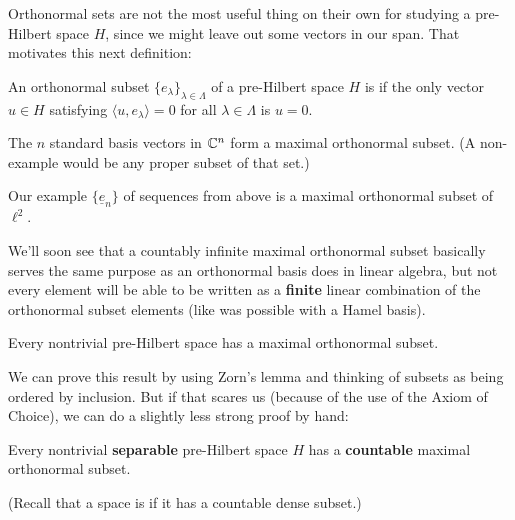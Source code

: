 Orthonormal sets are not the most useful thing on their own for studying a pre-Hilbert space $H$, since we might leave out some vectors in our span. That motivates this next definition:

\begin{definition}
An orthonormal subset $\{e_{\lambda}\}_{\lambda \in \Lambda}$ of a pre-Hilbert space $H$ is  if the only vector $u \in H$ satisfying $\langle u, e_\lambda \rangle =  0$ for all $\lambda \in \Lambda$ is $u = 0$.
\end{definition}

\begin{example}
The $n$ standard basis vectors in $\mathbb C^n$ form a maximal orthonormal subset. (A non-example would be any proper subset of that set.)
\end{example}

\begin{example}
Our example $\{\underline{e}_n\}$ of sequences from above is a maximal orthonormal subset of $\ell^2$.
\end{example}

We'll soon see that a countably infinite maximal orthonormal subset basically serves the same purpose as an orthonormal basis does in linear algebra, but not every element will be able to be written as a \textbf{finite} linear combination of the orthonormal subset elements (like was possible with a Hamel basis). 

\begin{theorem}
Every nontrivial pre-Hilbert space has a maximal orthonormal subset.
\end{theorem}

We can prove this result by using Zorn's lemma and thinking of subsets as being ordered by inclusion. But if that scares us (because of the use of the Axiom of Choice), we can do a slightly less strong proof by hand:

\begin{theorem}
Every nontrivial \textbf{separable} pre-Hilbert space $H$ has a \textbf{countable} maximal orthonormal subset.
\end{theorem}

(Recall that a space is  if it has a countable dense subset.)

